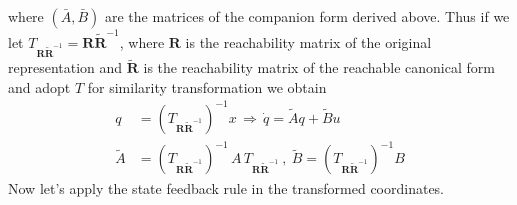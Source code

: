 \documentclass[twoside]{article}
\begin{document}
%
where $(\bar{A},\bar{B})$ are the matrices of the companion form derived above. Thus if we let 
$T_{\mathbf{R} \tilde{\mathbf{R}}^{-1}} = \mathbf{R} \tilde{\mathbf{R}}^{-1}$, where $\mathbf{R}$ is the reachability matrix of the
original representation and $\tilde{\mathbf{R}}$ is the reachability matrix of the reachable
canonical form and adopt $T$ for similarity transformation we obtain
%
\begin{align*}
	q &= \left( T_{\mathbf{R} \tilde{\mathbf{R}}^{-1}} \right)^{-1} x \, \Rightarrow \, \dot{q} = \tilde{A} q + \tilde{B} u \\
	\tilde{A} &= \left( T_{\mathbf{R} \tilde{\mathbf{R}}^{-1}} \right)^{-1} \, A \, T_{\mathbf{R} \tilde{\mathbf{R}}^{-1}} \ , \ \tilde{B} = \left(  T_{\mathbf{R} \tilde{\mathbf{R}}^{-1}} \right)^{-1} B 
\end{align*}
%
Now let's apply the state feedback rule in the transformed coordinates.
%
%
\end{document}

